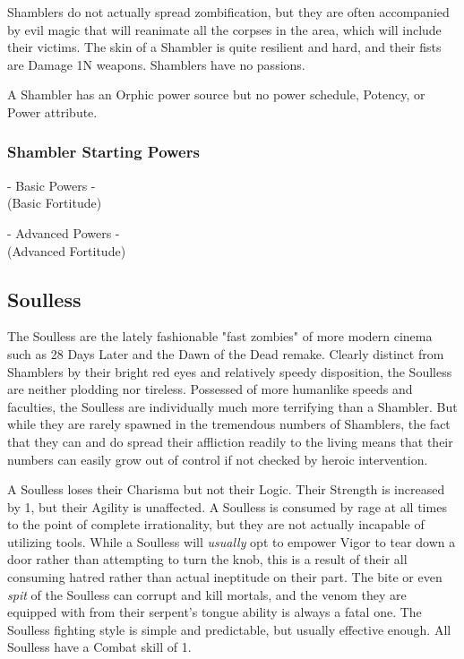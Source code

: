 Shamblers do not actually spread zombification, but they are often accompanied by evil magic that will reanimate all the corpses in the area, which will include their victims. The skin of a Shambler is quite resilient and hard, and their fists are Damage 1N weapons. Shamblers have no passions.

A Shambler has an Orphic power source but no power schedule, Potency, or Power attribute.

\subsubsection{Shambler Starting Powers}

\hspace{\parindent} - Basic Powers -\\
 (Basic Fortitude)

- Advanced Powers -\\
 (Advanced Fortitude)


\subsection{Soulless} 

The Soulless are the lately fashionable "fast zombies" of more modern cinema such as 28 Days Later and the Dawn of the Dead remake. Clearly distinct from Shamblers by their bright red eyes and relatively speedy disposition, the Soulless are neither plodding nor tireless. Possessed of more humanlike speeds and faculties, the Soulless are individually much more terrifying than a Shambler. But while they are rarely spawned in the tremendous numbers of Shamblers, the fact that they can and do spread their affliction readily to the living means that their numbers can easily grow out of control if not checked by heroic intervention.

A Soulless loses their Charisma but not their Logic. Their Strength is increased by 1, but their Agility is unaffected. A Soulless is consumed by rage at all times to the point of complete irrationality, but they are not actually incapable of utilizing tools. While a Soulless will \textit{usually} opt to empower Vigor to tear down a door rather than attempting to turn the knob, this is a result of their all consuming hatred rather than actual ineptitude on their part. The bite or even \textit{spit} of the Soulless can corrupt and kill mortals, and the venom they are equipped with from their serpent's tongue ability is always a fatal one. The Soulless fighting style is simple and predictable, but usually effective enough. All Soulless have a Combat skill of 1.

